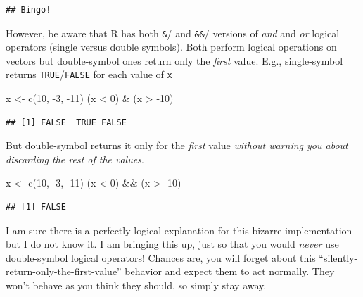 \documentclass[
]{book}
\newenvironment{Shaded}{\begin{snugshade}}{\end{snugshade}}
\newcommand{\DecValTok}[1]{\textcolor[rgb]{0.00,0.00,0.81}{#1}}
\newcommand{\FunctionTok}[1]{\textcolor[rgb]{0.00,0.00,0.00}{#1}}
\newcommand{\NormalTok}[1]{#1}
\newcommand{\OtherTok}[1]{\textcolor[rgb]{0.56,0.35,0.01}{#1}}
\newcommand{\SpecialCharTok}[1]{\textcolor[rgb]{0.00,0.00,0.00}{#1}}
\begin{document}
\begin{verbatim}
## Bingo!
\end{verbatim}

However, be aware that R has both \texttt{\&}/\texttt{\textbar{}} and \texttt{\&\&}/\texttt{\textbar{}\textbar{}} versions of \emph{and} and \emph{or} logical operators (single versus double symbols). Both perform logical operations on vectors but double-symbol ones return only the \emph{first} value. E.g., single-symbol returns \texttt{TRUE}/\texttt{FALSE} for each value of \texttt{x}

\begin{Shaded}
\begin{Highlighting}[]
\NormalTok{x }\OtherTok{\textless{}{-}} \FunctionTok{c}\NormalTok{(}\DecValTok{10}\NormalTok{, }\SpecialCharTok{{-}}\DecValTok{3}\NormalTok{, }\SpecialCharTok{{-}}\DecValTok{11}\NormalTok{)}
\NormalTok{(x }\SpecialCharTok{\textless{}} \DecValTok{0}\NormalTok{) }\SpecialCharTok{\&}\NormalTok{ (x }\SpecialCharTok{\textgreater{}} \SpecialCharTok{{-}}\DecValTok{10}\NormalTok{)}
\end{Highlighting}
\end{Shaded}

\begin{verbatim}
## [1] FALSE  TRUE FALSE
\end{verbatim}

But double-symbol returns it only for the \emph{first} value \emph{without warning you about discarding the rest of the values}.

\begin{Shaded}
\begin{Highlighting}[]
\NormalTok{x }\OtherTok{\textless{}{-}} \FunctionTok{c}\NormalTok{(}\DecValTok{10}\NormalTok{, }\SpecialCharTok{{-}}\DecValTok{3}\NormalTok{, }\SpecialCharTok{{-}}\DecValTok{11}\NormalTok{)}
\NormalTok{(x }\SpecialCharTok{\textless{}} \DecValTok{0}\NormalTok{) }\SpecialCharTok{\&\&}\NormalTok{ (x }\SpecialCharTok{\textgreater{}} \SpecialCharTok{{-}}\DecValTok{10}\NormalTok{)}
\end{Highlighting}
\end{Shaded}

\begin{verbatim}
## [1] FALSE
\end{verbatim}

I am sure there is a perfectly logical explanation for this bizarre implementation but I do not know it. I am bringing this up, just so that you would \emph{never} use double-symbol logical operators! Chances are, you will forget about this ``silently-return-only-the-first-value'' behavior and expect them to act normally. They won't behave as you think they should, so simply stay away.
\end{document}
